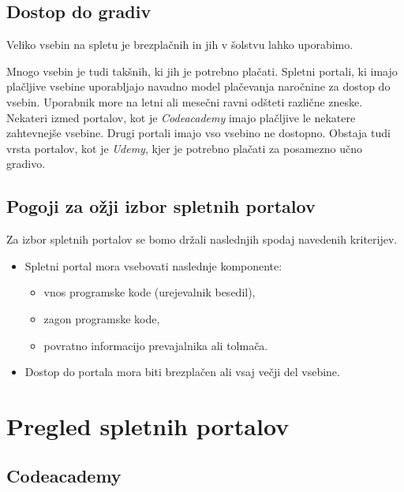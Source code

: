 \subsection{Dostop do gradiv}
\label{sec:dostop_do_gradiv}

Veliko vsebin na spletu je brezplačnih in jih v šolstvu lahko
uporabimo. %

Mnogo vsebin je tudi takšnih, ki jih je potrebno plačati. Spletni
portali, ki imajo plačljive vsebine uporabljajo navadno model
plačevanja naročnine za dostop do vsebin. Uporabnik more na letni ali
mesečni ravni odšteti različne zneske. %
Nekateri izmed portalov, kot je \emph{Codeacademy} imajo plačljive le
nekatere zahtevnejše vsebine. Drugi portali imajo vso vsebino ne
dostopno. Obstaja tudi vrsta portalov, kot je \emph{Udemy}, kjer je
potrebno plačati za posamezno učno gradivo.



\subsection{Pogoji za ožji izbor spletnih portalov}
\label{sec:pogoji_za_ožji_izbor_sp}

Za izbor spletnih portalov se bomo držali naslednjih spodaj navedenih kriterijev.

\begin{itemize}
\tightlist
\item Spletni portal mora vsebovati naslednje komponente:
  \begin{itemize}
    \tightlist
  \item vnos programske kode (urejevalnik besedil),
  \item zagon programske kode,
  \item povratno informacijo prevajalnika ali tolmača.
  \end{itemize}
\item Dostop do portala mora biti brezplačen ali vsaj večji del
  vsebine.
\end{itemize}

\section{Pregled spletnih portalov}
\label{sec:pregled_spletnih_port}


\subsection{Codeacademy}

